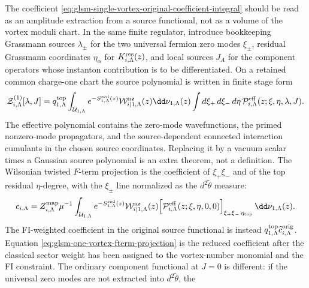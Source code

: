\begin{controlledapproximation}
\label{ca:glsm-one-vortex-source-functional-extraction}
The coefficient
\eqref{eq:glsm-single-vortex-original-coefficient-integral} should be read as an
amplitude extraction from a source functional, not as a volume of the vortex
moduli chart.  In the same finite regulator, introduce bookkeeping
Grassmann sources \(\lambda_\pm\) for the two universal fermion zero modes
\(\xi_\pm\), residual Grassmann coordinates \(\eta_\alpha\) for
\(K^{\rm res}_{i,\Lambda}(z)\), and local sources \(J_A\) for the component
operators whose instanton contribution is to be differentiated.  On a
retained common charge-one chart the source polynomial is written in finite
stage form
\begin{equation}
  \mathcal Z^{(1)}_{i,\Lambda}[\lambda,J]
  =
  q^{\rm top}_{1,\Lambda}
  \int_{\mathcal U_{1,\Lambda}}
  e^{-S^{\rm red}_{1,\Lambda}(z)}
  \mathcal W^{\rm nz}_{i|1,\Lambda}(z)
  \dd\nu_{1,\Lambda}(z)
  \int d\xi_+\,d\xi_-\,d\eta\,
  \mathcal P^{\rm eff}_{i,\Lambda}(z;\xi,\eta,\lambda,J).
  \label{eq:glsm-one-vortex-source-functional}
\end{equation}
The effective polynomial contains the zero-mode wavefunctions, the primed
nonzero-mode propagators, and the source-dependent connected interaction
cumulants in the chosen source coordinates.  Replacing it by a vacuum scalar
times a Gaussian source polynomial is an extra theorem, not a definition.
The Wilsonian twisted \(F\)-term projection is the coefficient of
\(\xi_+\xi_-\) and of the top residual \(\eta\)-degree, with the
\(\xi_\pm\) line normalized as the \(d^2\widetilde\theta\) measure:
\begin{equation}
  c_{i,\Lambda}
  =
  Z^{\rm map}_{i,\Lambda}\mu^{-1}
  \int_{\mathcal U_{1,\Lambda}}
  e^{-S^{\rm red}_{1,\Lambda}(z)}
  \mathcal W^{\rm nz}_{i|1,\Lambda}(z)
  \Bigl[
    \mathcal P^{\rm eff}_{i,\Lambda}(z;\xi,\eta,0,0)
  \Bigr]_{\xi_+\xi_-\,\eta_{\rm top}}\,
  \dd\nu_{1,\Lambda}(z).
  \label{eq:glsm-one-vortex-fterm-projection}
\end{equation}
The FI-weighted coefficient in the original source functional is instead
\(q^{\rm top}_{1,\Lambda}\widehat c^{\rm orig}_{i,\Lambda}\).  Equation
\eqref{eq:glsm-one-vortex-fterm-projection} is the reduced coefficient after
the classical sector weight has been assigned to the vortex-number monomial and
the FI constraint.
The ordinary component functional at \(J=0\) is different: if the universal
zero modes are not extracted into \(d^2\widetilde\theta\), the

\end{controlledapproximation}
